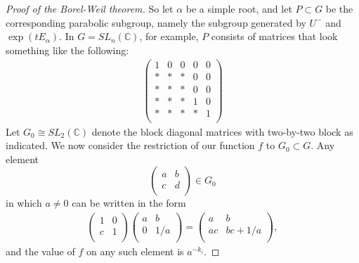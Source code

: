 \documentclass[12pt]{article}
\theoremstyle{plain}
\theoremstyle{definition}
\numberwithin{equation}{section}
\newcommand{\C}{\mathbb{C}}
\begin{document}
\begin{proof}[Proof of the Borel-Weil theorem]
So let $\alpha$ be a simple root, and let $P \subset G$ be the corresponding parabolic subgroup, namely the subgroup generated by $U^-$ and $\exp(t E_\alpha)$. In $G = SL_n(\C)$, for example, $P$ consists of matrices that look something like the following:
\begin{align*}
\left(
\begin{array}{c|cc|cc}
1 & 0 & 0 & 0 & 0 \\
\hline
* & * & * & 0 & 0 \\
* & * & * & 0 & 0 \\
\hline
* & * & * & 1 & 0 \\
* & * & * & * & 1 \\
\end{array}
\right)
\end{align*}
Let $G_0 \cong SL_2(\C)$ denote the block diagonal matrices with two-by-two block as indicated. We now consider the restriction of our function $f$ to $G_0 \subset G$. Any element
\[
\left(\begin{array}{cc}
a & b \\
c & d \\
\end{array}
\right) \in G_0
\]
in which $a \neq 0$ can be written in the form
\begin{align*}
\left(\begin{array}{cc}
1 & 0 \\
c & 1 \\
\end{array}
\right) \left(\begin{array}{cc}
a & b \\
0 & 1/a \\
\end{array}
\right) =
\left(\begin{array}{cc}
a & b \\
ac & bc + 1/a \\
\end{array}
\right),
\end{align*}
and the value of $f$ on any such element is $a^{-k_i}$.


\end{proof}
\end{document}
